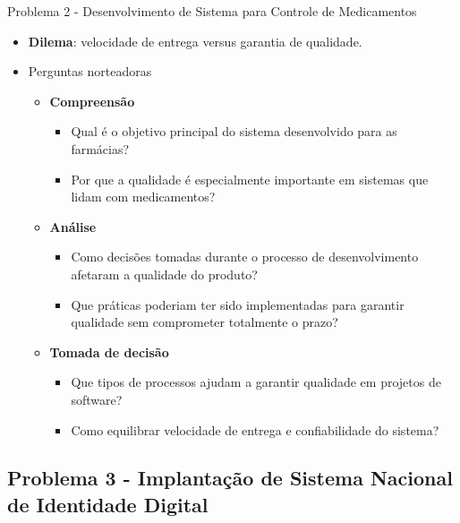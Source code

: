 \documentclass{beamer}
\begin{document}
\begin{frame}{Problema 2 - Desenvolvimento de Sistema para Controle de Medicamentos}
	\begin{itemize}
		\justifying
		\item \textbf{Dilema}: velocidade de entrega versus garantia de qualidade.
		\item Perguntas norteadoras
			\begin{itemize}
				\item \textbf{Compreensão}
					\begin{itemize}
						\justifying
						\item Qual é o objetivo principal do sistema desenvolvido para as farmácias?
						\item Por que a qualidade é especialmente importante em sistemas que lidam com medicamentos?
					\end{itemize}
				\item \textbf{Análise}
					\begin{itemize}
						\justifying
						\item Como decisões tomadas durante o processo de desenvolvimento afetaram a qualidade do produto?
						\item Que práticas poderiam ter sido implementadas para garantir qualidade sem comprometer totalmente o prazo?
					\end{itemize}
				\item \textbf{Tomada de decisão}
					\begin{itemize}
						\justifying
						\item Que tipos de processos ajudam a garantir qualidade em projetos de software?
						\item Como equilibrar velocidade de entrega e confiabilidade do sistema?
					\end{itemize}
			\end{itemize}
	\end{itemize}
\end{frame}

\subsection{Problema 3 - Implantação de Sistema Nacional de Identidade Digital}
\end{document}
